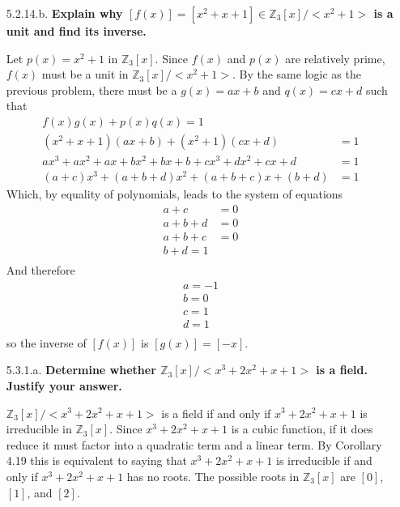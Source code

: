 \documentclass{article}
\begin{document}
\begin{enumerate}
		\item [5.2.14.b. ] \textbf{Explain why $[f(x)] = [x^2 + x + 1] \in \mathbb{Z}_3[x]/
			<x^2 + 1>$ is a unit and find its inverse.}

			Let $p(x) = x^2 + 1$ in $\mathbb{Z}_3[x]$. Since $f(x)$ and $p(x)$ are relatively prime,
			$f(x)$ must be a unit in $\mathbb{Z}_3[x]/<x^2 + 1>$. By the same logic as the previous
			problem, there must be a $g(x) = ax + b$ and $q(x) = cx + d$ such that
			\begin{align*}
				f(x)g(x) + p(x)q(x) = 1 \\
				(x^2 + x + 1)(ax + b) + (x^2 + 1)(cx + d) & = 1 \\
				ax^3 + ax^2 + ax + bx^2 + bx + b + cx^3 + dx^2 + cx + d & = 1 \\
				(a + c)x^3 + (a + b + d)x^2 + (a + b + c)x + (b + d) & = 1
			\end{align*}
			Which, by equality of polynomials, leads to the system of equations
			\begin{align*}
				a + c & = 0 \\
				a + b + d & = 0 \\
				a + b + c & = 0 \\
				b + d = 1 \\
			\end{align*}
			And therefore
			\begin{align*}
				a = -1 \\
				b = 0 \\
				c = 1 \\ 
				d = 1 \\
			\end{align*}
			so the inverse of $[f(x)]$ is $[g(x)] = [-x]$.

		\item [5.3.1.a. ] \textbf{Determine whether $\mathbb{Z}_3[x]/<x^3 + 2x^2 + x + 1>$ is a 
			field. Justify your answer.}

			$\mathbb{Z}_3[x]/<x^3 + 2x^2 + x + 1>$ is a field if and only if $x^3 + 2x^2 + x + 1$ is
			irreducible in $\mathbb{Z}_3[x]$. Since $x^3 + 2x^2 + x + 1$ is a cubic function, if it
			does reduce it must factor into a quadratic term and a linear term. By Corollary 4.19 
			this is equivalent to saying that $x^3 + 2x^2 + x + 1$ is irreducible if and only if 
			$x^3 + 2x^2 + x + 1$ has no roots. The possible roots in $\mathbb{Z}_3[x]$ are $[0]$, 
			$[1]$, and $[2]$.


\end{enumerate}
\end{document}
